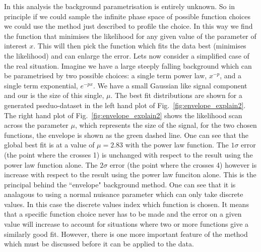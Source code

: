 In this analysis the background parametrisation is entirely unknown. So in principle if we could sample the infinite phase space of possible function choices we could use the method just described to profile the choice. In this way we find the function that minimises the likelihood for any given value of the parameter of interest $x$. This will then pick the function which fits the data best (minimises the likelihood) and can enlarge the error.
Lets now consider a simplified case of the real situation. Imagine we have a large steeply falling background which can be parametrised by two possible choices: a single term power law, $x^{-p}$, and a single term exponential, $e^{-px}$. We have a small Gaussian like signal component and our \POI is the size of this single, $\mu$. The best fit distributions are shown for a generated pseduo-dataset in the left hand plot of Fig.~\ref{fig:envelope_explain2}. The right hand plot of Fig.~\ref{fig:envelope_explain2} shows the likelihood scan across the parameter $\mu$, which represents the size of the signal, for the two chosen functions, the envelope is shown as the green dashed line. One can see that the global best fit is at a value of $\mu=2.83$ with the power law function. The $1\sigma$ error (the point where the \NLL crosses 1) is unchanged with respect to the result using the power law function alone. The $2\sigma$ error (the point where the \NLL crosses 4) however is increase with respect to the result using the power law funciton alone. This is the principal behind the ``envelope" background method. One can see that it is analagous to using a normal nuisance parameter which can only take discrete values. In this case the discrete values index which function is chosen. It means that a specific function choice never has to be made and the error on a given value will increase to account for situations where two or more functions give a similarly good fit. However, there is one more important feature of the method which must be discussed before it can be applied to the data.

